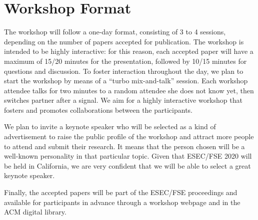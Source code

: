
\section{Workshop Format}
\label{sec:format}

The workshop will follow a one-day format, consisting of 3 to 4 sessions, depending on the number of papers accepted for publication.
The workshop is intended to be highly interactive: for this reason, each accepted paper will have a maximum of 15/20 minutes for the presentation, followed by 10/15 minutes for questions and discussion.
To foster interaction throughout the day, we plan to start the workshop by means of a “turbo mix-and-talk” session. Each workshop attendee talks for two minutes to a random attendee she does not know yet, then switches partner after a signal. We aim for a highly interactive workshop that fosters and promotes collaborations between the participants. %

We plan to invite a keynote speaker who will be selected as a kind of advertisement to raise the public profile of the workshop and attract more people to attend and submit their research. It means that the person chosen will be a well-known personality in that particular topic. Given that ESEC/FSE 2020 will be held in California, we are very confident that we will be able to select a great keynote speaker.

Finally, the accepted papers will be part of the ESEC/FSE proceedings and available for participants in advance through a workshop webpage and in the ACM digital library.
